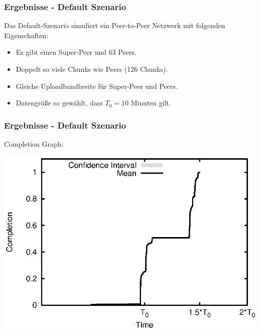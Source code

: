 
\begin{frame}
  \frametitle{Ergebnisse - Default Szenario}
  Das Default-Szenario simuliert ein Peer-to-Peer Netzwerk mit folgenden Eigenschaften:

  \begin{itemize}  
    \item Es gibt einen Super-Peer und 63 Peers.
    \item Doppelt so viele Chunks wie Peers (126 Chunks).
    \item Gleiche Uploadbandbreite für Super-Peer und Peers.
    \item Datengröße so gewählt, dass $T_0=10$ Minuten gilt. 
  \end{itemize}	
\end{frame}


\begin{frame}
  \frametitle{Ergebnisse - Default Szenario}
  Completion Graph:
  
  \begin{center}
    \includegraphics[width=1\textwidth]{fig/plots/scenario_1_default/plots/GeneratedMeanChunkCompletion.csv.eps}
  \end{center}
\end{frame}


